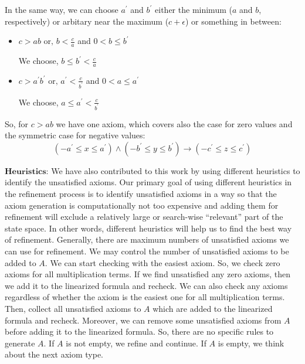 \noindent In the same way, we can choose $a^\prime$ and $b^\prime$ either the minimum ($a$ and $b$, respectively) or arbitary near the maximum ($c + \epsilon$) or something in between:
\begin{itemize}
    \item $c > ab \text{ or, } b < \frac{c}{a}$ and $0 < b \leq b^\prime$\newline
    
    We choose, $b \leq b^\prime < \frac{c}{a}$
     \item $c > a^\prime b^\prime \text{ or, } a^\prime < \frac{c}{b^\prime}$ and $0 < a \leq a^\prime$\newline
     
     We choose, $a \leq a^\prime < \frac{c}{b^\prime}$
\end{itemize}

\noindent  So, for $c > ab$ we have one axiom, which covers also the case for zero values and the symmetric case for negative values:
$$(-a^\prime \leq x \leq a^\prime) \wedge (-b^\prime \leq y \leq b^\prime) \to (-c^\prime \leq z \leq c^\prime)$$

\noindent  $\textbf{Heuristics:}$ We have also contributed to this work by using different heuristics to identify the unsatisfied axioms.
Our primary goal of using different heuristics in the refinement process is to identify unsatisfied axioms in a way so that the axiom generation is computationally not too expensive and adding them for refinement will exclude a relatively large or search-wise \enquote{relevant} part of the state space.
In other words, different heuristics will help us to find the best way of refinement.
Generally, there are maximum numbers of unsatisfied axioms we can use for refinement.
We may control the number of unsatisfied axioms to be added to $A$.
We can start checking with the easiest axiom. 
So, we check zero axioms for all multiplication terms.
If we find unsatisfied any zero axioms, then we add it to the linearized formula and recheck.
We can also check any axioms regardless of whether the axiom is the easiest one for all multiplication terms.
Then, collect all unsatisfied axioms to $A$ which are added to the linearized formula and recheck.
Moreover, we can remove some unsatisfied axioms from $A$ before adding it to the linearized formula.
So, there are no specific rules to generate $A$.
If $A$ is not empty, we refine and continue. 
If $A$ is empty, we think about the next axiom type.\newline

